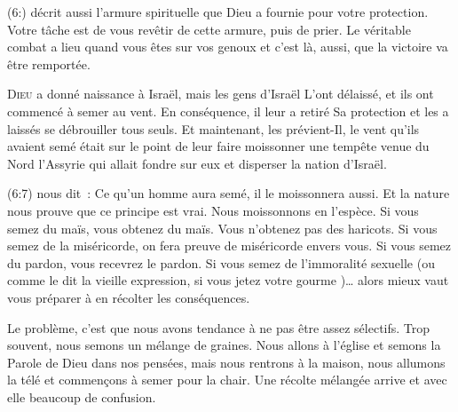 (6:) décrit aussi l'armure spirituelle que Dieu
 a fournie pour votre protection. Votre tâche est de vous revêtir
 de cette armure, puis de prier. Le véritable combat a lieu
 quand vous êtes sur vos genoux et c'est là, aussi,
 que la victoire va être remportée. 

\dvrule






\lettrine{D}{ieu} a donné naissance à Israël, mais les gens d'Israël
 L'ont délaissé, et ils ont commencé à semer au vent.
 En conséquence, il leur a retiré Sa protection et les a laissés 
 se débrouiller tous seuls. Et maintenant, les prévient-Il,
 le vent qu'ils avaient semé était sur le point de leur faire moissonner
 une tempête venue du Nord
 \ocadr l'Assyrie qui allait fondre sur eux et disperser la nation d'Israël. 


(6:7) nous dit~: 
 \Og Ce qu'un homme aura semé, il le moissonnera aussi. \Fg{}
 Et la nature nous prouve que ce principe est vrai.
 Nous moissonnons en l'espèce. Si vous semez du maïs, vous obtenez du maïs.
 Vous n'obtenez pas des haricots. Si vous semez de la miséricorde,
 on fera preuve de miséricorde envers vous. Si vous semez du pardon,
 vous recevrez le pardon. Si vous semez de l'immoralité sexuelle
 (ou comme le dit la vieille expression,
 \Og si vous jetez votre gourme \Fg{})\dots{}
 alors mieux vaut vous préparer à en récolter les conséquences. 

Le problème, c'est que nous avons tendance à ne pas être assez sélectifs.
 Trop souvent, nous semons un mélange de graines.
 Nous allons à l'église et semons la Parole de Dieu dans nos pensées,
 mais nous rentrons à la maison, nous allumons la télé et commen\c{c}ons à semer
 pour la chair. Une récolte mélangée arrive et avec elle beaucoup de confusion. 

